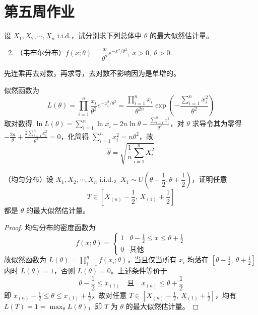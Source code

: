 \section{第五周作业}
\begin{homework}[7]
设 \(X_1,X_2,\cdots,X_n\) i.i.d.，试分别求下列总体中 \(\theta\) 的最大似然估计量。

\begin{enumerate}
    \setcounter{enumi}{1}
    \item （韦布尔分布）\(f(x;\theta)=\dfrac{x}{\theta^2}e^{-x^2/\theta^2},\ x>0,\ \theta>0.\)
\end{enumerate}
\begin{dxtips}
    先连乘再去对数，再求导，去对数不影响因为是单增的。
\end{dxtips}
\end{homework}
\begin{solution}
似然函数为
\[
L(\theta) = \prod_{i=1}^{n} \frac{x_i}{\theta^2} e^{-x_i^2/\theta^2} = \frac{\prod_{i=1}^n x_i}{\theta^{2n}} \exp\!\left(-\frac{\sum_{i=1}^n x_i^2}{\theta^2}\right)
\]
取对数得 $\ln L(\theta) = \sum_{i=1}^n \ln x_i - 2n\ln\theta - \frac{\sum_{i=1}^n x_i^2}{\theta^2}$，对 $\theta$ 求导令其为零得 $-\frac{2n}{\theta} + \frac{2\sum_{i=1}^n x_i^2}{\theta^3} = 0$，化简得 $\sum_{i=1}^n x_i^2 = n\theta^2$，故
\[
\hat{\theta} = \sqrt{\frac{1}{n}\sum_{i=1}^n X_i^2}
\]
\end{solution}
\begin{homework}[8]
（均匀分布）设 \(X_1,X_2,\cdots,X_n\) i.i.d.，\(X_1\sim U\left(\theta-\dfrac{1}{2},\theta+\dfrac{1}{2}\right)\)，证明任意
\[
T\in \left[X_{(n)}-\frac{1}{2},\,X_{(1)}+\frac{1}{2}\right]
\]
都是 \(\theta\) 的最大似然估计量。
\end{homework}
\begin{proof}
均匀分布的密度函数为
\[
f(x;\theta) = \begin{cases} 1 & \theta - \frac{1}{2} \leq x \leq \theta + \frac{1}{2} \\ 0 & \text{其他} \end{cases}
\]
故似然函数为 $L(\theta) = \prod_{i=1}^n f(x_i;\theta)$，当且仅当所有 $x_i$ 均落在 $[\theta-\frac{1}{2},\ \theta+\frac{1}{2}]$ 内时 $L(\theta)=1$，否则 $L(\theta)=0$。上述条件等价于
\[
\theta - \frac{1}{2} \leq x_{(1)} \quad \text{且} \quad x_{(n)} \leq \theta + \frac{1}{2}
\]
即 $x_{(n)} - \frac{1}{2} \leq \theta \leq x_{(1)} + \frac{1}{2}$，故对任意 $T \in \left[X_{(n)}-\frac{1}{2},\ X_{(1)}+\frac{1}{2}\right]$，均有 $L(T) = 1 = \max_\theta L(\theta)$，即 $T$ 为 $\theta$ 的最大似然估计量。
\end{proof}
